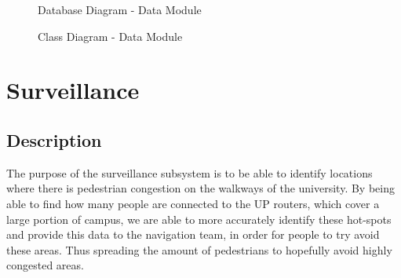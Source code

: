 \documentclass[english]{article}
\begin{document}
        \begin{figure}[H]
            \centering              
            \centerline{}
            \caption{Database Diagram - Data Module}
        \end{figure}     
        
        \begin{figure}[H]
            \centering              
            \centerline{}
            \caption{Class Diagram - Data Module}
        \end{figure} 

    \newpage
    \section{Surveillance}    
        \subsection{Description}    
            The purpose of the surveillance subsystem is to be able to identify locations where there is pedestrian congestion on the walkways of the university.
            By being able to find how many people are connected to the UP routers, which cover a large portion of campus, we are able to more accurately identify these hot-spots and provide this data to the navigation team, in order for people to try avoid these areas. Thus spreading the amount of pedestrians to hopefully avoid highly congested areas. 
\end{document}
